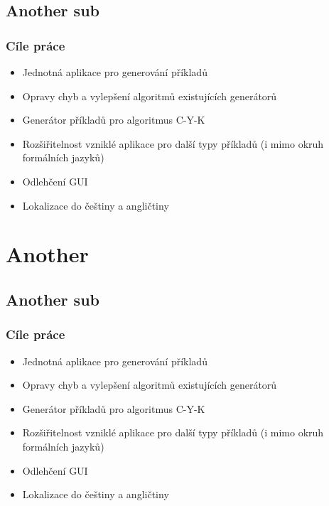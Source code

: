 \documentclass[pdf,compress]{beamer}
\begin{document}
\subsection[]{Another sub}
\begin{frame}
\frametitle{Cíle práce}
\begin{itemize}
\item Jednotná aplikace pro generování příkladů
\item Opravy chyb a vylepšení algoritmů existujících generátorů \pause
\item Generátor příkladů pro algoritmus C-Y-K \pause
\item Rozšiřitelnost vzniklé aplikace pro další typy příkladů (i mimo okruh formálních jazyků) \pause
\item Odlehčení GUI \pause
\item Lokalizace do češtiny a angličtiny
\end{itemize}

\end{frame}

\section[Another]{Another}
\subsection[]{Another sub}
\begin{frame}
\frametitle{Cíle práce}
\begin{itemize}
\item Jednotná aplikace pro generování příkladů
\item Opravy chyb a vylepšení algoritmů existujících generátorů \pause
\item Generátor příkladů pro algoritmus C-Y-K \pause
\item Rozšiřitelnost vzniklé aplikace pro další typy příkladů (i mimo okruh formálních jazyků) \pause
\item Odlehčení GUI \pause
\item Lokalizace do češtiny a angličtiny
\end{itemize}

\end{frame}
\end{document}
